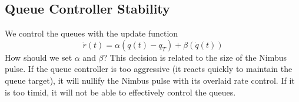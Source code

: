 \begin{appendix}
\section{Queue Controller Stability}\label{app:derive-ab}



We control the queues with the update function 
\begin{equation} 
    \dot{r}(t) = \alpha (q(t) - q_T) + \beta (\dot{q}(t))
\end{equation}
%
How should we set $\alpha$ and $\beta$? This decision is related to the size of the Nimbus pulse. 
If the queue controller is too aggressive (\ie it reacts quickly to maintain the queue target), it will nullify the Nimbus pulse with its overlaid rate control.
If it is too timid, it will not be able to effectively control the queues.


\end{appendix}
